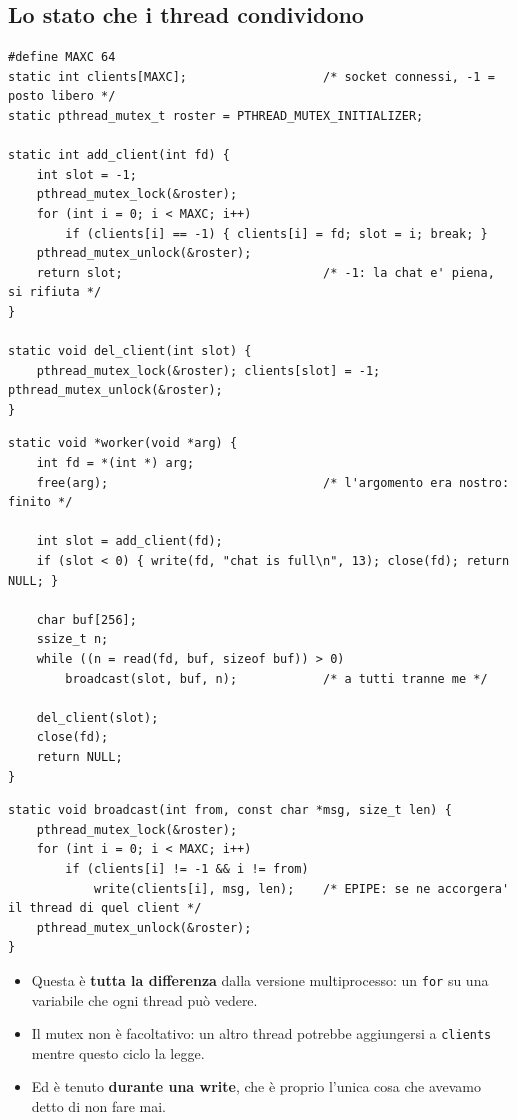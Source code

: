 \subsection{Lo stato che i thread condividono}

\begin{lstlisting}[language={[POSIX]C}, style=wnumbers, title={La lista dei client e il suo mutex}]
#define MAXC 64
static int clients[MAXC];                   /* socket connessi, -1 = posto libero */
static pthread_mutex_t roster = PTHREAD_MUTEX_INITIALIZER;

static int add_client(int fd) {
    int slot = -1;
    pthread_mutex_lock(&roster);
    for (int i = 0; i < MAXC; i++)
        if (clients[i] == -1) { clients[i] = fd; slot = i; break; }
    pthread_mutex_unlock(&roster);
    return slot;                            /* -1: la chat e' piena, si rifiuta */
}

static void del_client(int slot) {
    pthread_mutex_lock(&roster); clients[slot] = -1; pthread_mutex_unlock(&roster);
}
\end{lstlisting}

\begin{lstlisting}[language={[POSIX]C}, style=wnumbers, title={Il worker: registrarsi, servire, cancellarsi}]
static void *worker(void *arg) {
    int fd = *(int *) arg;
    free(arg);                              /* l'argomento era nostro: finito */

    int slot = add_client(fd);
    if (slot < 0) { write(fd, "chat is full\n", 13); close(fd); return NULL; }

    char buf[256];
    ssize_t n;
    while ((n = read(fd, buf, sizeof buf)) > 0)
        broadcast(slot, buf, n);            /* a tutti tranne me */

    del_client(slot);
    close(fd);
    return NULL;
}
\end{lstlisting}

\begin{lstlisting}[language={[POSIX]C}, style=wnumbers, title={Inviare a tutti gli altri}]
static void broadcast(int from, const char *msg, size_t len) {
    pthread_mutex_lock(&roster);
    for (int i = 0; i < MAXC; i++)
        if (clients[i] != -1 && i != from)
            write(clients[i], msg, len);    /* EPIPE: se ne accorgera' il thread di quel client */
    pthread_mutex_unlock(&roster);
}
\end{lstlisting}

\begin{itemize}
    \item Questa è \textbf{tutta la differenza} dalla versione multiprocesso: un \texttt{for} su una variabile che ogni
          thread può vedere.
    \item Il mutex non è facoltativo: un altro thread potrebbe aggiungersi a \texttt{clients} mentre questo ciclo la legge.
    \item Ed è tenuto \textbf{durante una write}, che è proprio l'unica cosa che avevamo detto di non fare mai.
\end{itemize}

